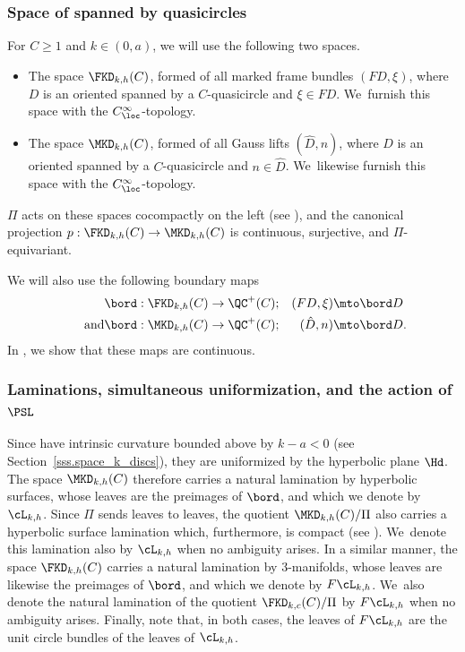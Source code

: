 \subsubsection{Space of \kdisks spanned by quasicircles}
For $C\geq 1$ and $k\in(0,a)$, we will use the following two spaces.
\begin{itemize}
\item The space $\FKD_{k,h}(C)$, formed of all marked frame bundles $(FD,\xi)$, where $D$ is an oriented \kdisk spanned by a $C$-quasicircle and $\xi\in FD$. We~furnish this space with the $C^\infty_\loc$-topology.
\item The space $\MKD_{k,h}(C)$, formed of all Gauss lifts $(\hat D,n)$, where $D$ is an oriented \kdisk spanned by a $C$-quasicircle and $n\in\hat D$. We~likewise furnish this space with the $C^\infty_\loc$-topology.
\end{itemize}
$\Pi$ acts on these spaces cocompactly on the left (see \cite{ALS,LabourieGAFA}), and the canonical projection $p:\FKD_{k,h}(C)\to\MKD_{k,h}(C)$ is continuous, surjective, and $\Pi$-equivariant.

We will also use the following boundary maps
\begin{align*}
\bord:\FKD_{k,h}(C)&\to\QC^+(C);&(FD,\xi)&\mto\bord D\\
\tag*{and}\bord:\MKD_{k,h}(C)&\to\QC^+(C);&(\hat{D},n)&\mto\bord D.
\end{align*}
In \cite{ALS}, we show that these maps are continuous.

\subsubsection{Laminations, simultaneous uniformization, and the action of $\PSL$}
\label{sssec:LaminationsSimultaneousUniformization}
Since \kdisks have intrinsic curvature bounded above by $k-a<0$ (see Section~\ref{sss.space_k_discs}), they are uniformized by the hyperbolic plane $\Hd$. The space $\MKD_{k,h}(C)$ therefore carries a natural lamination by hyperbolic surfaces, whose leaves are the preimages of $\bord$, and which we denote by $\cL_{k,h}$. Since $\Pi$ sends leaves to leaves, the quotient $\MKD_{k,h}(C)/\Pi$ also carries a hyperbolic surface lamination which, furthermore, is compact (see \cite{LabourieGAFA}). We~denote this lamination also by $\cL_{k,h}$ when no ambiguity arises. In a similar manner, the space $\FKD_{k,h}(C)$ carries a natural lamination by $3$\nobreakdash-manifolds, whose leaves are likewise the preimages of $\bord$, and which we denote by $F\cL_{k,h}$. We~also denote the natural lamination of the quotient $\FKD_{k,c}(C)/\Pi$ by $F\cL_{k,h}$ when no ambiguity arises. Finally, note that, in both cases, the leaves of $F\cL_{k,h}$ are the unit circle bundles of the leaves of $\cL_{k,h}$.

